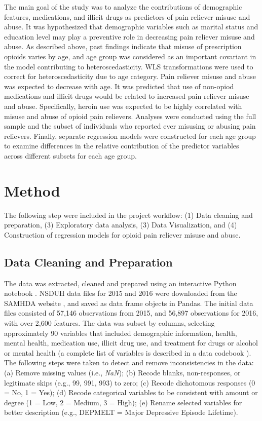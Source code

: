\documentclass[sigconf]{acmart}
\begin{document}
The main goal of the study was to analyze the contributions of demographic 
features, medications, and illicit drugs as predictors of pain reliever misuse 
and abuse. It was hypothesized that demographic variables such as marital 
status and education level may play a preventive role in decreasing pain 
reliever misuse and abuse. As described above, past findings indicate that 
misuse of prescription opioids varies by age, and age group was considered as 
an important covariant in the model contributing to heteroscedasticity. WLS 
transformations were used to correct for heteroscedasticity due to age category. 
Pain reliever misuse and abuse was expected to decrease with age. It was 
predicted that use of non-opiod medications and illicit drugs would be 
related to increased pain reliever misuse and abuse. Specifically, 
heroin use was expected to be highly correlated with misuse and abuse of 
opioid pain relievers. Analyses were conducted using the full sample and the
subset of individuals who reported ever misusing or abusing pain relievers. 
Finally, separate regression models were constructed for each age group 
to examine differences in the relative contribution of the predictor variables 
across different subsets for each age group. 

\section{Method}

The following step were included in the project workflow: (1) Data cleaning 
and preparation, (3) Exploratory data analysis, (3) Data Visualization, and 
(4) Construction of regression models for opioid pain reliever misuse and 
abuse. 

\subsection{Data Cleaning and Preparation }

The data was extracted, cleaned and prepared using an interactive Python 
notebook \cite{mckinney17}. NSDUH data files for 2015 and 2016 were downloaded 
from the SAMHDA website \cite{samhsa16}, and saved as data frame objects in 
Pandas. The initial data files consisted of 57,146 observations from 2015, 
and 56,897 observations for 2016, with over 2,600 features. The data was 
subset by columns, selecting approximately 90 variables that included 
demographic information, health, mental health, medication use, illicit drug 
use, and treatment for drugs or alcohol or mental health (a complete list of
variables is described in a data codebook ). The following 
steps were taken to detect and remove inconsistencies in the data: (a) 
Remove missing values (i.e., \textit{NaN}); (b) Recode blanks, non-responses, 
or legitimate skips (e.g., 99, 991, 993) to zero; (c) Recode dichotomous 
responses (0 = No, 1 = Yes); (d) Recode categorical variables to be consistent 
with amount or degree (1 = Low, 2 = Medium, 3 = High); (e) Rename selected 
variables for better description (e.g., DEPMELT = Major Depressive Episode 
Lifetime).
\end{document}
